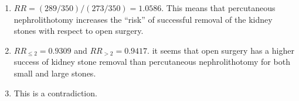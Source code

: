 \begin{enumerate}
    \item $RR = (289/350)/(273/350) = 1.0586$.  This means that percutaneous nephrolithotomy increases the “risk” of successful removal of the kidney stones with respect to open surgery.
    \hfill \cite{statistics/book/Statistics-for-Data-Scientists/Maurits-Kaptein}

    \item $RR_{\leq 2} = 0.9309$ and $RR_{>2} = 0.9417$. it seems that open surgery has a higher success of kidney stone removal than percutaneous nephrolithotomy for both small and large stones.
    \hfill \cite{statistics/book/Statistics-for-Data-Scientists/Maurits-Kaptein}

    \item This is a contradiction.
    \hfill \cite{statistics/book/Statistics-for-Data-Scientists/Maurits-Kaptein}
\end{enumerate}










